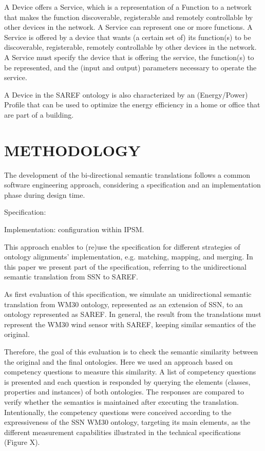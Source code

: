 \documentclass{sig-alternate-05-2015}
\begin{document}
A Device offers a Service, which  is a representation of a Function to a network that makes the function discoverable, registerable and remotely controllable by other devices in the network. A Service can represent one or more functions. A Service is offered by a device that wants (a certain set of) its function(s) to be discoverable, registerable, remotely controllable by other devices in the network. A Service must specify the device that is offering the service, the function(s) to be represented, and the (input and output) parameters necessary to operate the service. 

A Device in the SAREF ontology is also characterized by an (Energy/Power) Profile that can be used to optimize the energy efficiency in a home or office that are part of a building.


\section{METHODOLOGY}
The development of the bi-directional semantic translations follows a common software engineering approach, considering a specification and an implementation phase during design time. 

Specification: 

Implementation: configuration within IPSM.

This approach enables to (re)use the specification for different strategies of ontology alignments’ implementation, e.g. matching, mapping, and merging. In this paper we present part of the specification, referring to the unidirectional semantic translation from SSN to SAREF.

As first evaluation of this specification, we simulate an unidirectional semantic translation from WM30 ontology, represented as an extension of SSN, to an ontology represented as SAREF. In general, the result from the translations must represent the WM30 wind sensor with SAREF, keeping similar semantics of the original. 

Therefore, the goal of this evaluation is to check the semantic similarity between the original and the final ontologies. Here we used an approach based on competency questions to measure this similarity. A list of competency questions is presented and each question is responded by querying the elements (classes, properties and instances) of both ontologies. The responses are compared to verify whether the semantics is maintained after executing the translation. Intentionally, the competency questions were conceived according to the expressiveness of the SSN WM30 ontology, targeting its main elements, as the different measurement capabilities illustrated in the technical specifications (Figure X).
\end{document}
